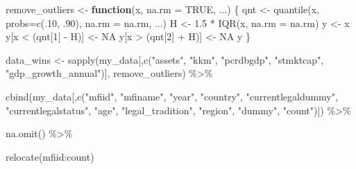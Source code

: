 \documentclass[a4paper,nobind]{templates/ociamthesis}
\newenvironment{Shaded}{\begin{snugshade}}{\end{snugshade}}
\newcommand{\AttributeTok}[1]{\textcolor[rgb]{0.77,0.63,0.00}{#1}}
\newcommand{\ConstantTok}[1]{\textcolor[rgb]{0.00,0.00,0.00}{#1}}
\newcommand{\ControlFlowTok}[1]{\textcolor[rgb]{0.13,0.29,0.53}{\textbf{#1}}}
\newcommand{\DecValTok}[1]{\textcolor[rgb]{0.00,0.00,0.81}{#1}}
\newcommand{\FloatTok}[1]{\textcolor[rgb]{0.00,0.00,0.81}{#1}}
\newcommand{\FunctionTok}[1]{\textcolor[rgb]{0.00,0.00,0.00}{#1}}
\newcommand{\NormalTok}[1]{#1}
\newcommand{\OtherTok}[1]{\textcolor[rgb]{0.56,0.35,0.01}{#1}}
\newcommand{\SpecialCharTok}[1]{\textcolor[rgb]{0.00,0.00,0.00}{#1}}
\newcommand{\StringTok}[1]{\textcolor[rgb]{0.31,0.60,0.02}{#1}}
\renewenvironment{Shaded}
{
  \vspace{10pt}%
  \begin{snugshade}%
}{%
  \end{snugshade}%
  \vspace{8pt}%
}
\begin{document}
\begin{Shaded}
\begin{Highlighting}[]
\NormalTok{remove\_outliers }\OtherTok{\textless{}{-}} \ControlFlowTok{function}\NormalTok{(x, }\AttributeTok{na.rm =} \ConstantTok{TRUE}\NormalTok{, ...) \{}
\NormalTok{  qnt }\OtherTok{\textless{}{-}} \FunctionTok{quantile}\NormalTok{(x, }\AttributeTok{probs=}\FunctionTok{c}\NormalTok{(.}\DecValTok{10}\NormalTok{, .}\DecValTok{90}\NormalTok{), }\AttributeTok{na.rm =}\NormalTok{ na.rm, ...)}
\NormalTok{  H }\OtherTok{\textless{}{-}} \FloatTok{1.5} \SpecialCharTok{*} \FunctionTok{IQR}\NormalTok{(x, }\AttributeTok{na.rm =}\NormalTok{ na.rm)}
\NormalTok{  y }\OtherTok{\textless{}{-}}\NormalTok{ x}
\NormalTok{  y[x }\SpecialCharTok{\textless{}}\NormalTok{ (qnt[}\DecValTok{1}\NormalTok{] }\SpecialCharTok{{-}}\NormalTok{ H)] }\OtherTok{\textless{}{-}} \ConstantTok{NA}
\NormalTok{  y[x }\SpecialCharTok{\textgreater{}}\NormalTok{ (qnt[}\DecValTok{2}\NormalTok{] }\SpecialCharTok{+}\NormalTok{ H)] }\OtherTok{\textless{}{-}} \ConstantTok{NA}
\NormalTok{  y}
\NormalTok{\}}


\NormalTok{data\_wins }\OtherTok{\textless{}{-}} \FunctionTok{sapply}\NormalTok{(my\_data[,}\FunctionTok{c}\NormalTok{(}\StringTok{"assets"}\NormalTok{, }\StringTok{"kkm"}\NormalTok{, }\StringTok{"pcrdbgdp"}\NormalTok{, }\StringTok{"stmktcap"}\NormalTok{, }\StringTok{"gdp\_growth\_annual"}\NormalTok{)], remove\_outliers) }\SpecialCharTok{\%\textgreater{}\%} 
  
  \FunctionTok{cbind}\NormalTok{(my\_data[,}\FunctionTok{c}\NormalTok{(}\StringTok{"mfiid"}\NormalTok{, }\StringTok{"mfiname"}\NormalTok{, }\StringTok{"year"}\NormalTok{, }\StringTok{"country"}\NormalTok{, }\StringTok{"currentlegaldummy"}\NormalTok{, }
\StringTok{"currentlegalstatus"}\NormalTok{, }\StringTok{"age"}\NormalTok{, }\StringTok{"legal\_tradition"}\NormalTok{, }\StringTok{"region"}\NormalTok{, }\StringTok{"dummy"}\NormalTok{, }\StringTok{"count"}\NormalTok{)]) }\SpecialCharTok{\%\textgreater{}\%} 
  
  \FunctionTok{na.omit}\NormalTok{() }\SpecialCharTok{\%\textgreater{}\%} 
  
  \FunctionTok{relocate}\NormalTok{(mfiid}\SpecialCharTok{:}\NormalTok{count)}
\end{Highlighting}
\end{Shaded}
\end{document}
